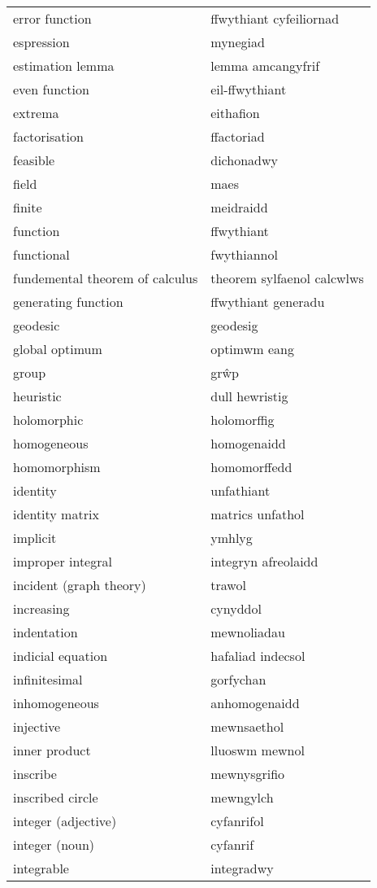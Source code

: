 \begin{supertabular}{p{0.22\textwidth}p{0.22\textwidth}}
error function & ffwythiant cyfeiliornad \\
espression & mynegiad \\
estimation lemma & lemma amcangyfrif \\
even function & eil-ffwythiant \\
extrema & eithafion \\
factorisation & ffactoriad \\
feasible & dichonadwy \\
field & maes \\
finite & meidraidd \\
function & ffwythiant \\
functional & fwythiannol \\
fundemental theorem of calculus & theorem sylfaenol calcwlws \\
generating function & ffwythiant generadu \\
geodesic & geodesig \\
global optimum & optimwm eang \\
group & grŵp \\
heuristic & dull hewristig \\
holomorphic & holomorffig \\
homogeneous & homogenaidd \\
homomorphism & homomorffedd \\
identity & unfathiant \\
identity matrix & matrics unfathol \\
implicit & ymhlyg \\
improper integral & integryn afreolaidd \\
incident (graph theory) & trawol \\
increasing & cynyddol \\
indentation & mewnoliadau \\
indicial equation & hafaliad indecsol \\
infinitesimal & gorfychan \\
inhomogeneous & anhomogenaidd \\
injective & mewnsaethol \\
inner product & lluoswm mewnol \\
inscribe & mewnysgrifio \\
inscribed circle & mewngylch \\
integer (adjective) & cyfanrifol \\
integer (noun) & cyfanrif \\
integrable & integradwy \\

\end{supertabular}
